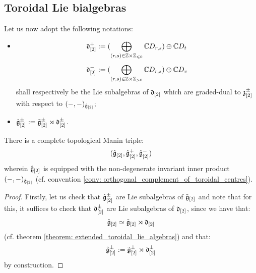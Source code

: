     \subsection{Toroidal Lie bialgebras}
        \begin{convention} \label{conv: positive_and_negative_parts_of_derivation_subalgebras_of_extended_toroidal_algebras}
            Let us now adopt the following notations:
            \begin{itemize}
                \item
                    $$\d_{[2]}^+ := ( \bigoplus_{(r, s) \in \Z \x \Z_{\leq 0} } \bbC D_{r, s} ) \oplus \bbC D_t$$
                    $$\d_{[2]}^- := ( \bigoplus_{(r, s) \in \Z \x \Z_{> 0} } \bbC D_{r, s} ) \oplus \bbC D_v$$
                shall respectively be the Lie subalgebras of $\mathfrak{d}_{[2]}$ which are graded-dual to $\mathfrak{z}_{[2]}^{\pm}$ with respect to $(-, -)_{\hat{\mathfrak{g}}_{[2]}}$;
                \item $\hat{\mathfrak{g}}_{[2]}^{\pm} := \tilde{\mathfrak{g}}_{[2]}^{\pm} \rtimes \mathfrak{d}_{[2]}^{\pm}$.
            \end{itemize}
        \end{convention}    
        \begin{theorem} \label{theorem: extended_toroidal_manin_triples}
            There is a complete topological Manin triple:
                $$(\hat{\mathfrak{g}}_{[2]}, \hat{\mathfrak{g}}_{[2]}^+, \hat{\mathfrak{g}}_{[2]}^-)$$
            wherein $\hat{\mathfrak{g}}_{[2]}$ is equipped with the non-degenerate invariant inner product $(-, -)_{\hat{\mathfrak{g}}_{[2]}}$ (cf. convention \ref{conv: orthogonal_complement_of_toroidal_centres}).
        \end{theorem}
            \begin{proof}
                Firstly, let us check that $\hat{\mathfrak{g}}_{[2]}^{\pm}$ are Lie subalgebras of $\hat{\mathfrak{g}}_{[2]}$ and note that for this, it suffices to check that $\mathfrak{d}_{[2]}^{\pm}$ are Lie subalgebras of $\mathfrak{d}_{[2]}$, since we have that:
                    $$\hat{\mathfrak{g}}_{[2]} \simeq \tilde{\mathfrak{g}}_{[2]} \rtimes \mathfrak{d}_{[2]}$$
                (cf. theorem \ref{theorem: extended_toroidal_lie_algebras}) and that:
                    $$\hat{\mathfrak{g}}_{[2]}^{\pm} := \tilde{\mathfrak{g}}_{[2]}^{\pm} \rtimes \mathfrak{d}_{[2]}^{\pm}$$
                by construction. 
            \end{proof}
